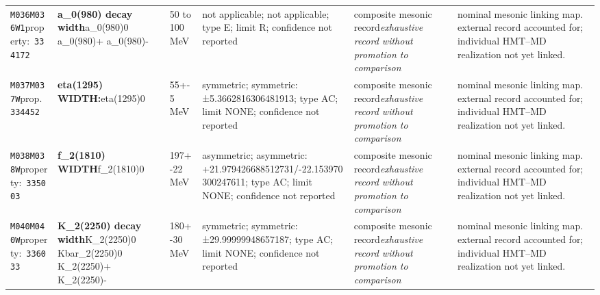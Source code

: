 \begin{landscape}
\begin{longtable}{L{1.85cm}L{4.45cm}L{2.35cm}L{4.05cm}L{3.35cm}L{7.15cm}}
\texttt{M036}\newline \texttt{M036W1}\newline property:\ \texttt{334172} & \textbf{a\_\allowbreak{}0(980) decay width}\newline a\_\allowbreak{}0(980)0 \textbar{}\allowbreak{} a\_\allowbreak{}0(980)+ \textbar{}\allowbreak{} a\_\allowbreak{}0(980)- & 50 to 100\,MeV & not applicable; not applicable; type E; limit R; confidence not reported & composite mesonic record\newline \emph{exhaustive record without promotion to comparison} & nominal mesonic linking map. external record accounted for; individual HMT--MD realization not yet linked. \\
\texttt{M037}\newline \texttt{M037W}\newline prop.\ \texttt{334452} & \textbf{eta(1295) WIDTH:}\newline eta(1295)0 & 55+-5\,MeV & symmetric; symmetric: ±5.3662816306481913; type AC; limit NONE; confidence not reported & composite mesonic record\newline \emph{exhaustive record without promotion to comparison} & nominal mesonic linking map. external record accounted for; individual HMT--MD realization not yet linked. \\
\texttt{M038}\newline \texttt{M038W}\newline property:\ \texttt{335003} & \textbf{f\_\allowbreak{}2(1810) WIDTH}\newline f\_\allowbreak{}2(1810)0 & 197+-22\,MeV & asymmetric; asymmetric: +21.979426688512731/-22.153970300247611; type AC; limit NONE; confidence not reported & composite mesonic record\newline \emph{exhaustive record without promotion to comparison} & nominal mesonic linking map. external record accounted for; individual HMT--MD realization not yet linked. \\
\texttt{M040}\newline \texttt{M040W}\newline property:\ \texttt{336033} & \textbf{K\_\allowbreak{}2(2250) decay width}\newline K\_\allowbreak{}2(2250)0 \textbar{}\allowbreak{} Kbar\_\allowbreak{}2(2250)0 \textbar{}\allowbreak{} K\_\allowbreak{}2(2250)+ \textbar{}\allowbreak{} K\_\allowbreak{}2(2250)- & 180+-30\,MeV & symmetric; symmetric: ±29.99999948657187; type AC; limit NONE; confidence not reported & composite mesonic record\newline \emph{exhaustive record without promotion to comparison} & nominal mesonic linking map. external record accounted for; individual HMT--MD realization not yet linked. \\

\end{longtable}
\end{landscape}
